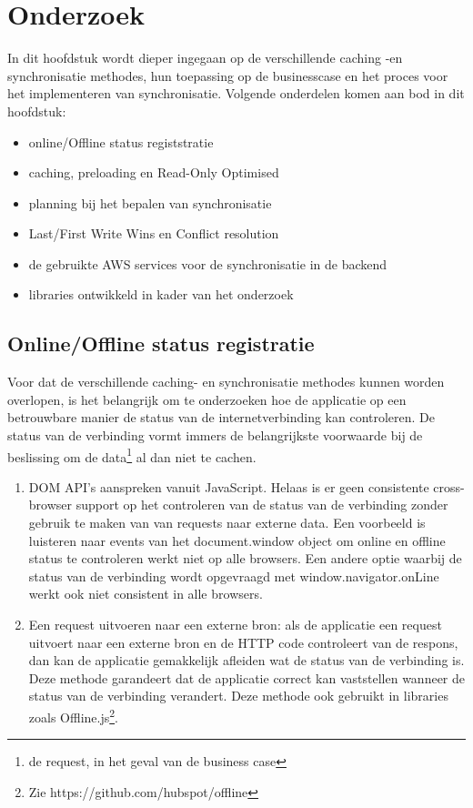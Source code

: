 
\chapter{Onderzoek}
\label{ch:onderzoek}

In dit hoofdstuk wordt dieper ingegaan op de verschillende caching -en synchronisatie methodes, hun toepassing op de businesscase en het proces voor het implementeren van synchronisatie. Volgende onderdelen komen aan bod in dit hoofdstuk:
\begin{itemize}
\item online/Offline status registstratie
\item caching, preloading en Read-Only Optimised
\item planning bij het bepalen van synchronisatie
\item Last/First Write Wins en Conflict resolution
\item de gebruikte AWS services voor de synchronisatie in de backend
\item libraries ontwikkeld in kader van het onderzoek 
\end{itemize}

\section{Online/Offline status registratie}
Voor dat de verschillende caching- en synchronisatie methodes kunnen worden overlopen, is het belangrijk om te onderzoeken hoe de applicatie op een betrouwbare manier de status van de internetverbinding kan controleren. De status van de verbinding vormt immers de belangrijkste voorwaarde bij de beslissing om de data\footnote{de request, in het geval van de business case}  al dan niet te cachen.
\clearpage
\begin{enumerate}
\item DOM API's aanspreken vanuit JavaScript. Helaas is er geen consistente\autocite{offline-spec-mozilla} cross-browser support op het controleren van de status van de verbinding zonder gebruik te maken van van requests naar externe data. Een voorbeeld is luisteren naar events van het document.window object om online en offline status te controleren werkt niet op alle browsers. Een andere optie waarbij de status van de verbinding wordt opgevraagd met window.navigator.onLine werkt ook niet consistent in alle browsers.
\item Een request uitvoeren naar een externe bron: als de applicatie een request uitvoert naar een externe bron en de HTTP code controleert van de respons, dan kan de applicatie gemakkelijk afleiden wat de status van de verbinding is. Deze methode garandeert dat de applicatie correct kan vaststellen wanneer de status van de verbinding verandert. Deze methode ook gebruikt in libraries zoals Offline.js\footnote{Zie https://github.com/hubspot/offline}.
\end{enumerate}

